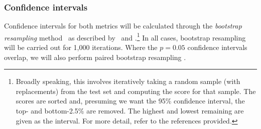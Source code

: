 \documentclass[11pt]{article}
\newcommand{\comment}[1]{\todo{#1}}
\begin{document}

%

\subsubsection{Confidence intervals}
Confidence intervals for both metrics will be calculated through the
\emph{bootstrap resampling} method~\citep{efron94} as described
by~\citet{koehn04} and \citet{zhang04}.\footnote{Broadly speaking,
  this involves iteratively taking a random sample (with replacements)
  from the test set and computing the score for that sample. The
  scores are sorted and, presuming we want the 95\% confidence
  interval, the top- and bottom-2.5\% are removed. The highest and
  lowest remaining are given as the interval. For more detail, refer
  to the references provided.} In all cases, bootstrap resampling will
be carried out for 1,000 iterations. Where the $p = 0.05$ confidence
intervals overlap, we will also perform paired bootstrap resampling
\citep{koehn04}.
\end{document}

